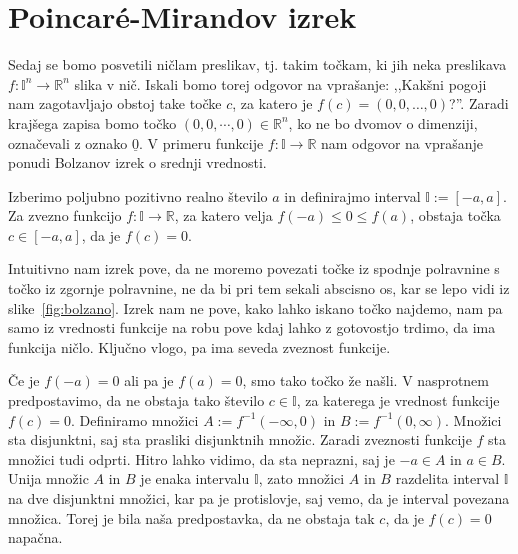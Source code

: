 \documentclass[mat1]{fmfdelo}
\newcommand{\R}{\mathbb R}
\newcommand{\I}{\mathbb I}
\newcommand{\0}{\underline{0}}
\def\citat#1{,,#1''}
\begin{document}
\section{Poincar\'e-Mirandov izrek}\label{raz:PM}
Sedaj se bomo posvetili ničlam preslikav, tj. takim točkam, ki jih neka preslikava $f : \I^n \to \R^n$ slika v nič. Iskali bomo torej odgovor na vprašanje: \citat{Kakšni pogoji nam zagotavljajo obstoj take točke $c$, za katero je $f(c) = (0, 0, \dots, 0)$?}. Zaradi krajšega zapisa bomo točko $(0, 0, \cdots, 0) \in \R^n$, ko ne bo dvomov o dimenziji, označevali z oznako $\0$. V primeru funkcije $f : \I \to \R$ nam odgovor na vprašanje ponudi Bolzanov izrek o srednji vrednosti.
\begin{izrek}\label{izr:bolzano}
Izberimo poljubno pozitivno realno število $a$ in definirajmo interval $\I := [-a, a]$. Za zvezno funkcijo $f : \I \to \R$, za katero velja $f(-a) \leq 0 \leq f(a)$, obstaja točka $c \in [-a, a]$, da je $f(c) = 0$.
\end{izrek}
Intuitivno nam izrek pove, da ne moremo povezati točke iz spodnje polravnine s točko iz zgornje polravnine, ne da bi pri tem sekali abscisno os, kar se lepo vidi iz slike~\ref{fig:bolzano}. Izrek nam ne pove, kako lahko iskano točko najdemo, nam pa samo iz vrednosti funkcije na robu pove kdaj lahko z gotovostjo trdimo, da ima funkcija ničlo. Ključno vlogo, pa ima seveda zveznost funkcije.
\begin{dokaz}
Če je $f(-a) = 0$ ali pa je $f(a) = 0$, smo tako točko že našli. V nasprotnem predpostavimo, da ne obstaja tako število $c \in \I$, za katerega je vrednost funkcije $f(c) = 0$. Definiramo množici $A := f^{-1}(- \infty, 0)$ in $B := f^{-1}(0, \infty)$. Množici sta disjunktni, saj sta prasliki disjunktnih množic. Zaradi zveznosti funkcije $f$ sta množici tudi odprti. Hitro lahko vidimo, da sta neprazni, saj je $-a \in A$ in $a \in B$. Unija množic $A$ in $B$ je enaka intervalu $\I$, zato množici $A$ in $B$ razdelita interval $\I$ na dve disjunktni množici, kar pa je protislovje, saj vemo, da je interval povezana množica. Torej je bila naša predpostavka, da ne obstaja tak $c$, da je $f(c) = 0$ napačna.
\end{dokaz}
\end{document}
